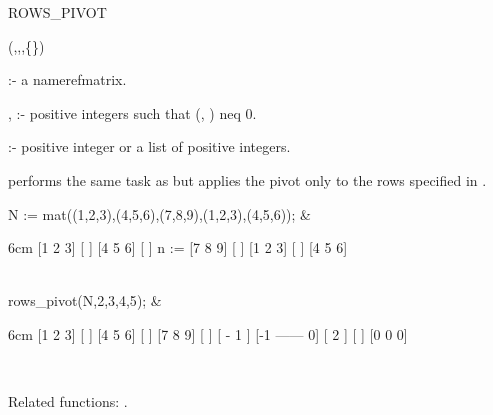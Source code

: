 \begin{Operator}[rowspivot]{ROWS_PIVOT}

\begin{Syntax}
(,,,\{\})
\end{Syntax}

     :- a nameref{matrix}.

, :- positive integers such that (,
                     ) neq 0.

  :- positive integer or a list of positive integers.

 performs the same task as   but applies 
the pivot only to the rows specified in .


\begin{Examples}

N := mat((1,2,3),(4,5,6),(7,8,9),(1,2,3),(4,5,6)); &
\begin{multilineoutput}{6cm}
     [1  2  3]
     [       ]
     [4  5  6]
     [       ]
n := [7  8  9]
     [       ]
     [1  2  3]
     [       ]
     [4  5  6]
\end{multilineoutput}\\

rows_pivot(N,2,3,{4,5}); &
\begin{multilineoutput}{6cm}
[1     2     3]
[             ]
[4     5     6]
[             ]
[7     8     9]
[             ]
[      - 1    ]
[-1  ------  0]
[      2      ]
[             ]
[0     0     0]
\end{multilineoutput}\\

\end{Examples}

Related functions: .

\end{Operator}


